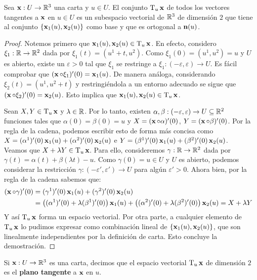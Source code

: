 \begin{prop}
Sea $\operatorname{\mathbf{x}}:U\to\mathbb{R}^3$ una carta y $u\in U$. El conjunto $\mathrm{T}_{u}\operatorname{\mathbf{x}}$ de todos los vectores tangentes a $\operatorname{\mathbf{x}}$ en $u\in U$ es un subespacio vectorial de $\mathbb{R}^3$ de dimensión $2$ que tiene al conjunto $\{\operatorname{\mathbf{x}}_1(u),\operatorname{\mathbf{x}}_2(u)\}$ como base y que es ortogonal a $\operatorname{\mathbf{n}}(u)$.
\begin{proof}
Notemos primero que $\operatorname{\mathbf{x}}_1(u),\operatorname{\mathbf{x}}_2(u)\in\mathrm{T}_u\operatorname{\mathbf{x}}$. En efecto, considero $\xi_1:\mathbb{R}\to\mathbb{R}^2$ dada por $\xi_1(t)=(u^1+t,u^2)$. Como $\xi_1(0)=(u^1,u^2)=u$ y $U$ es abierto, existe un $\varepsilon>0$ tal que $\xi_1$ se restringe a $\xi_1:(-\varepsilon,\varepsilon)\to U$. Es fácil comprobar que $(\operatorname{\mathbf{x}}\circ\xi_1)'(0)=\operatorname{\mathbf{x}}_1(u)$. De manera análoga, considerando $\xi_2(t)=(u^1,u^2+t)$ y restringiéndola a un entorno adecuado se sigue que $(\operatorname{\mathbf{x}}\circ\xi_2)'(0)=\operatorname{\mathbf{x}}_2(u)$. Esto implica que $\operatorname{\mathbf{x}}_1(u),\operatorname{\mathbf{x}}_2(u)\in\mathrm{T}_u\operatorname{\mathbf{x}}$.

Sean $X,Y\in\mathrm{T}_u\operatorname{\mathbf{x}}$ y $\lambda\in\mathbb{R}$. Por lo tanto, existen $\alpha,\beta:(-\varepsilon,\varepsilon)\to U\subseteq\mathbb{R}^2$ funciones tales que $\alpha(0)=\beta(0)=u$ y $X=(\operatorname{\mathbf{x}}\circ\alpha)'(0)$, $Y=(\operatorname{\mathbf{x}}\circ\beta)'(0)$. Por la regla de la cadena, podemos escribir esto de forma más concisa como $X=(\alpha^1)'(0)\operatorname{\mathbf{x}}_1(u) + (\alpha^2)'(0)\operatorname{\mathbf{x}}_2(u)$ e $Y=(\beta^1)'(0)\operatorname{\mathbf{x}}_1(u)+(\beta^2)'(0)\operatorname{\mathbf{x}}_2(u)$. Veamos que $X+\lambda Y\in\mathrm{T}_u\operatorname{\mathbf{x}}$. Para ello, consideremos $\gamma:\mathbb{R}\to\mathbb{R}^2$ dada por $\gamma(t)=\alpha(t)+\beta(\lambda t)-u$. Como $\gamma(0)=u\in U$ y $U$ es abierto, podemos considerar la restricción $\gamma:(-\varepsilon',\varepsilon')\to U$ para algún $\varepsilon'>0$. Ahora bien, por la regla de la cadena sabemos que: \begin{align*}(\operatorname{\mathbf{x}}\circ\gamma)'(0)&=(\gamma^1)'(0)\operatorname{\mathbf{x}}_1(u)+(\gamma^2)'(0)\operatorname{\mathbf{x}}_2(u)\\ &= \left((\alpha^1)'(0)+\lambda (\beta^1)'(0)\right)\operatorname{\mathbf{x}}_1(u) + \left((\alpha^2)'(0)+\lambda (\beta^2)'(0)\right)\operatorname{\mathbf{x}}_2(u) = X+\lambda Y\end{align*} 
Y así $\mathrm{T}_u\operatorname{\mathbf{x}}$ forma un espacio vectorial. Por otra parte, a cualquier elemento de $\mathrm{T}_u\operatorname{\mathbf{x}}$ lo pudimos expresar como combinación lineal de $\{\operatorname{\mathbf{x}}_1(u),\operatorname{\mathbf{x}}_2(u)\}$, que son linealmente independientes por la definición de carta. Esto concluye la demostración.
\end{proof}
\end{prop}

\begin{defn}
Si $\operatorname{\mathbf{x}}:U\to\mathbb{R}^3$ es una carta, decimos que el espacio vectorial $\mathrm{T}_u\operatorname{\mathbf{x}}$ de dimensión $2$ es el \textbf{plano tangente} a $\operatorname{\mathbf{x}}$ en $u$.
\end{defn}

